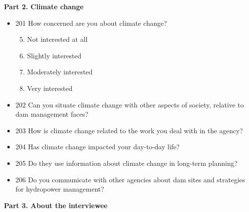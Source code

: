 \documentclass[11pt,english]{article}
\theoremstyle{plain} \newtheorem{claim}{Claim}
\theoremstyle{plain} \newtheorem{prop}{Proposition}
\theoremstyle{plain} \newtheorem{hypo}{Hypothesis}
\begin{document}
\textbf{Part 2. Climate change}

\begin{itemize}
\item[] 201 How concerned are you about climate change?

 \renewcommand{\labelenumii}{\Roman{enumii}}
\begin{enumerate}
  \setcounter{enumii}{4}
\item Not interested at all
\item Slightly interested
\item Moderately interested
\item Very interested
\end{enumerate}

\item[] 202 Can you situate climate change with other aspects of society, relative to dam management faces? 

\item[] 203 How is climate change related to the work you deal with in the agency? 

\item[] 204 Has climate change impacted your day-to-day life? 

\item[] 205 Do they use information about climate change in long-term planning? 

\item[] 206 Do you communicate with other agencies about dam sites and strategies for hydropower management? 

\end{itemize}

\textbf{Part 3. About the interviewee}
\end{document}
